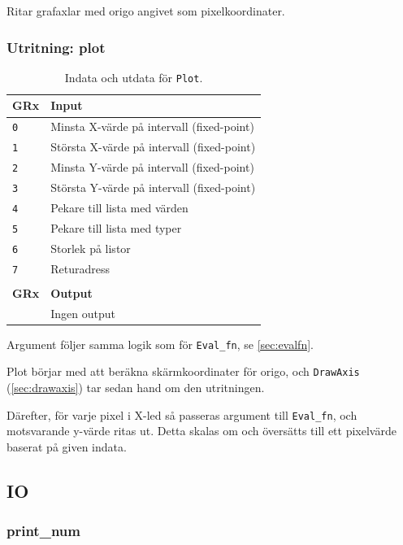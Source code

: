 \documentclass[]{article}
\begin{document}
\noindent
Ritar grafaxlar med origo angivet som pixelkoordinater.

\subsubsection{Utritning: plot}

\begin{table}[H]
\centering
\begin{tabular}{ll}
	\textbf{GRx} & \textbf{Input}               \\ \hline
	\texttt{0}   & Minsta X-värde på intervall (fixed-point)  \\
	\texttt{1}   & Största X-värde på intervall (fixed-point) \\
	\texttt{2}   & Minsta Y-värde på intervall (fixed-point)  \\
	\texttt{3}   & Största Y-värde på intervall (fixed-point) \\
	\texttt{4}   & Pekare till lista med värden \\
	\texttt{5}   & Pekare till lista med typer  \\
	\texttt{6}   & Storlek på listor            \\
	\texttt{7}   & Returadress                  \\
	             &  \\
	\textbf{GRx} & \textbf{Output}              \\ \hline
	             & Ingen output
\end{tabular}
\caption{Indata och utdata för \texttt{Plot}.}
\end{table}

\noindent
Argument följer samma logik som för \texttt{Eval\_fn}, se \ref{sec:evalfn}.

Plot börjar med att beräkna skärmkoordinater för origo, och \texttt{DrawAxis} (\ref{sec:drawaxis}) tar sedan hand om den utritningen.

Därefter, för varje pixel i X-led så passeras argument till \texttt{Eval\_fn}, och motsvarande y-värde ritas ut. Detta skalas om och översätts till ett pixelvärde baserat på given indata.

\subsection{IO}
\subsubsection{print\_num}
\end{document}
